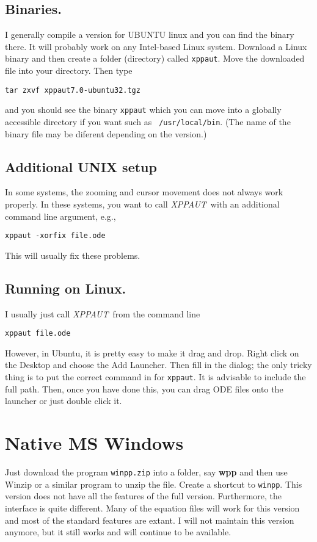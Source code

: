 \documentclass{article}
\newcommand{\XPP}{{\sl XPPAUT\, }}
\begin{document}
\subsection{Binaries.} I generally compile a version for UBUNTU linux
and you can find the binary there. It will probably work on any
Intel-based Linux system.  Download a Linux binary and then create a
folder (directory) called {\tt xppaut}. Move the downloaded file into
your directory. Then type 
\begin{verbatim}
tar zxvf xppaut7.0-ubuntu32.tgz
\end{verbatim}
and you should see the binary {\tt xppaut} which you can move into a
globally accessible directory if you want such as {\tt
/usr/local/bin}. (The name of the binary file may be diferent depending on the version.) 
\subsection{Additional UNIX setup} In some systems, the zooming
and cursor movement does not always work properly.  In these systems,
you want to call \XPP with an additional command line argument, e.g., 
\begin{verbatim}
xppaut -xorfix file.ode 
\end{verbatim}
This will usually fix these problems.

\subsection{Running on Linux.}
I usually just call \XPP from the command line
\begin{verbatim}
xppaut file.ode
\end{verbatim}
However, in Ubuntu, it is pretty easy to make it drag and drop. Right
click on the Desktop and choose the Add Launcher. Then fill in the
dialog; the only tricky thing is to put the correct command in for
{\tt xppaut}. It is advisable to include the full path. Then, once you
have done this, you can drag ODE files onto the launcher or just
double click it.


\section{Native MS Windows} 
Just download the program {\tt winpp.zip} into a folder, say {\bf wpp}
and then use Winzip or a similar program to unzip the file. Create a
shortcut to {\tt winpp}.  This version does not have all the features
of the full version. Furthermore, the interface is quite
different. Many of the equation files will work for this version and
most of the standard features are extant. I will not maintain this
version anymore, but it still works and will continue to be available.
\end{document}
